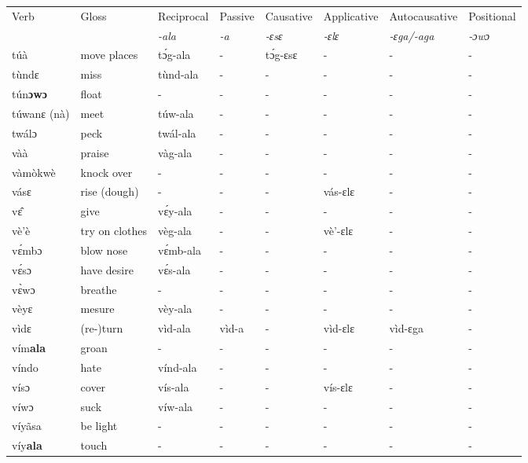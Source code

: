 \begin{sidewaystable}
\begin{tabular}{llllllll}
 \lsptoprule
 Verb & Gloss & Reciprocal & Passive  & Causative  & Applicative   & Autocausative & Positional   \\
  &    & {\itshape -ala} & {\itshape -a} & {\itshape -ɛsɛ} & {\itshape -ɛlɛ} & {\itshape -ɛga/-aga}  & {\itshape -ɔwɔ}  \\
\midrule
túà & move places & tɔ́g-ala & - & tɔ́g-ɛsɛ & - &  - & - \\
tùndɛ & miss & tùnd-ala & - & - & - & - & - \\
tún{\bfseries ɔwɔ} & float & - & - & - & - & - & - \\   
túwanɛ (nà) & meet & túw-ala & - & - & - & - & - \\
twálɔ & peck & twál-ala & - & - & - & - & - \\
vàà & praise & vàg-ala & - & - & -  & - & - \\
vàmòkwè & knock over & -  & - & - & - & - & - \\
vásɛ & rise (dough) & - & - & - &  vás-ɛlɛ & - & - \\
vɛ̂ & give & vɛ́y-ala & - & - & - & - & - \\
vè'è & try on clothes & vèg-ala & - & - & vè'-ɛlɛ & - & - \\
vɛ́mbɔ & blow nose & vɛ́mb-ala & - & - & - & - & - \\
vɛ́sɔ & have desire & vɛ́s-ala & - & - & - & - & - \\
vɛ̀wɔ & breathe & - & - & - & - & - & - \\
vèyɛ & mesure & vèy-ala & - & - & -  & -  & - \\
vìdɛ & (re-)turn & vìd-ala & vìd-a & - & vìd-ɛlɛ & vìd-ɛga & - \\
vím{\bfseries ala} & groan & - & - & - & - & - & - \\
víndo & hate & vínd-ala & - & - & - & - & - \\
vísɔ & cover & vís-ala & - & - &  vís-ɛlɛ & - & - \\
víwɔ & suck & víw-ala & - & - & - & - & - \\
víyãsa & be light & - & - & - & - & - & - \\
víy{\bfseries ala} & touch & -  & - & - & - & - & - \\
\midrule\end{tabular}\end{sidewaystable}

